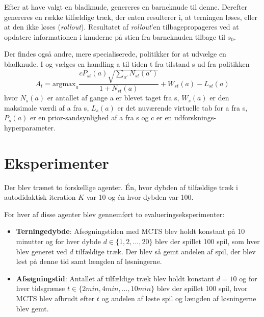 \documentclass[../main.tex]{subfiles}
\begin{document}
Efter at have valgt en bladknude, genereres en barneknude til denne.
Derefter genereres en række tilfældige træk, der enten resulterer i, at terningen løses, eller at den ikke løses (\emph{rollout}).
Resultatet af \emph{rollout}'en tilbagepropageres ved at opdatere informationen i knuderne på stien fra barneknuden tilbage til $s_0$. 

Der findes også andre, mere specialiserede, politikker for at udvælge en bladknude.
I \cite{HumansBeGone} og \cite{mcaleer2018solving} vælges en handling a til tiden t fra tilstand s ud fra politikken
$$A_t=\text{argmax}_a\frac{cP_{st}(a)\sqrt{\sum_{a'}N_{st}(a')}}{1+N_{st}(a)} + W_{st}(a) - L_{st}(a)$$
hvor $N_s(a)$ er antallet af gange a er blevet taget fra s, $W_s(a)$ er den maksimale værdi af a fra s, $L_s(a)$ er det nuværende virtuelle tab for a fra s, $P_s(a)$ er en prior-sandsynlighed af a fra s og c er en udforsknings-hyperparameter. 
  

\section{Eksperimenter}
Der blev trænet to forskellige agenter. Én, hvor dybden af tilfældige træk i autodidaktisk iteration \(K\) var 10 og én hvor dybden var 100. 

For hver af disse agenter blev gennemført to evalueringseksperimenter:
\begin{itemize}
	\item \textbf{Terningedybde}:
	Afsøgningstiden med MCTS blev holdt konstant på 10 minutter og for hver dybde \(d\in \{1,2,...,20\}\) blev der spillet 100 spil, som hver blev generet ved \(d\) tilfældige træk.
	Der blev så gemt andelen af spil, der blev løst på denne tid samt længden af løsningerne.
	\item \textbf{Afsøgningstid}:
	Antallet af tilfældige træk blev holdt konstant \(d=10\) og for hver tidsgrænse \(t\in \{2\unit{min}, 4\unit{min}, ..., 10\unit{min}\}\) blev der spillet 100 spil, hvor MCTS blev afbrudt efter \(t\) og andelen af løste spil og længden af løsningerne blev gemt.
\end{itemize}
\end{document}
